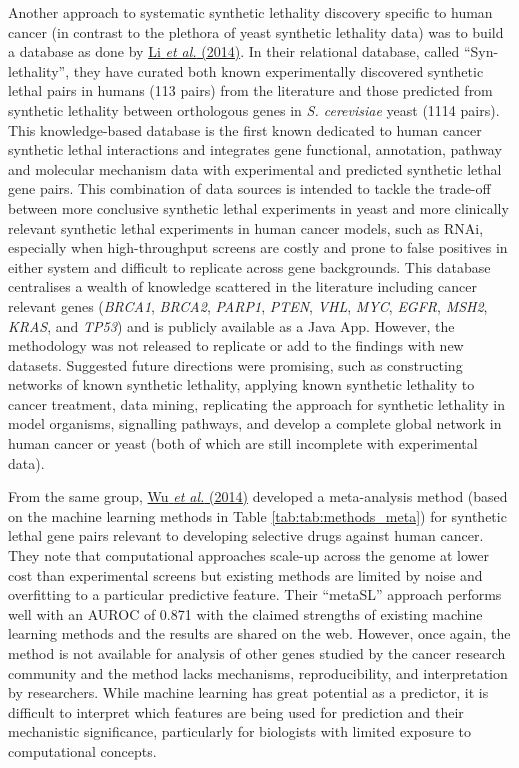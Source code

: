 Another approach to systematic synthetic lethality discovery specific to human cancer (in contrast to the plethora of yeast synthetic lethality data) was to build a database as done by \hyperlink{ENREF69}{Li}\hyperlink{ENREF69}{\textit{ et al.}}\hyperlink{ENREF69}{ (2014)}. In their relational database, called {\textquotedblleft}Syn-lethality{\textquotedblright}, they have curated both known experimentally discovered synthetic lethal pairs in humans (113 pairs) from the literature and those predicted from synthetic lethality between orthologous genes in \textit{S. cerevisiae} yeast (1114 pairs). This knowledge-based database is the first known dedicated to human cancer synthetic lethal interactions and integrates gene functional, annotation, pathway and molecular mechanism data with experimental and predicted synthetic lethal gene pairs. This combination of data sources is intended to tackle the trade-off between more conclusive synthetic lethal experiments in yeast and more clinically relevant synthetic lethal experiments in human cancer models, such as RNAi, especially when high-throughput screens are costly and prone to false positives in either system and difficult to replicate across gene backgrounds. This database centralises a wealth of knowledge scattered in the literature including cancer relevant genes (\textit{BRCA1}, \textit{BRCA2}, \textit{PARP1}, \textit{PTEN}, \textit{VHL}, \textit{MYC}, \textit{EGFR}, \textit{MSH2}, \textit{KRAS}, and \textit{TP53}) and is publicly available as a Java App. However, the methodology was not released to replicate or add to the findings with new datasets. Suggested future directions were promising, such as constructing networks of known synthetic lethality, applying known synthetic lethality to cancer treatment, data mining, replicating the approach for synthetic lethality in model organisms, signalling pathways, and develop a complete global network in human cancer or yeast (both of which are still incomplete with experimental data).  

From the same group, \hyperlink{ENREF114}{Wu}\hyperlink{ENREF114}{\textit{ et al.}}\hyperlink{ENREF114}{ (2014)} developed a meta-analysis method (based on the machine learning methods in Table \ref{tab:tab:methods_meta}) for synthetic lethal gene pairs relevant to developing selective drugs against human cancer. They note that computational approaches scale-up across the genome at lower cost than experimental screens but existing methods are limited by noise and overfitting to a particular predictive feature. Their {\textquotedblleft}metaSL{\textquotedblright} approach performs well with an AUROC of 0.871 with the claimed strengths of existing machine learning methods and the results are shared on the web. However, once again, the method is not available for analysis of other genes studied by the cancer research community and the method lacks mechanisms, reproducibility, and interpretation by researchers. While machine learning has great potential as a predictor, it is difficult to interpret which features are being used for prediction and their mechanistic significance, particularly for biologists with limited exposure to computational concepts.  

